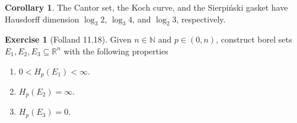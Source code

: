 \documentclass[11pt]{amsart}
\theoremstyle{definition}
\newtheorem{cor}[definition]{Corollary}
\newtheorem{ex}[definition]{Exercise}
\newcommand{\R}{\ensuremath{\mathbb{R}}}
\newcommand{\N}{\ensuremath{\mathbb{N}}}
\begin{document}
\begin{cor}
	The Cantor set, the Koch curve, and the Sierpiński gasket have Hausdorff dimension \( \log_3 2\), \( \log_3 4\), and \( \log_2 3 \), respectively.
\end{cor}

%
%	
%	

%	


\begin{ex}[Folland 11.18]
	Given \( n \in \N \) and \( p \in (0, n) \), construct borel sets \( E_1, E_2, E_3 \subseteq \R^n \) with the following properties
	\begin{enumerate}
		\item \( 0 < H_p(E_1) < \infty \).
		\item \( H_p(E_2) = \infty \).
		\item \( H_p(E_3) = 0\).
	\end{enumerate}
\end{ex}
\end{document}
